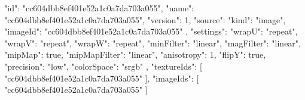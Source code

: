 {
  "id": "cc604dbb8ef401e52a1c0a7da703a055",
  "name": "cc604dbb8ef401e52a1c0a7da703a055",
  "version": 1,
  "source": {
    "kind": "image",
    "imageId": "cc604dbb8ef401e52a1c0a7da703a055"
  },
  "settings": {
    "wrapU": "repeat",
    "wrapV": "repeat",
    "wrapW": "repeat",
    "minFilter": "linear",
    "magFilter": "linear",
    "mipMap": true,
    "mipMapFilter": "linear",
    "anisotropy": 1,
    "flipY": true,
    "precision": "low",
    "colorSpace": "srgb"
  },
  "textureIds": [
    "cc604dbb8ef401e52a1c0a7da703a055"
  ],
  "imageIds": [
    "cc604dbb8ef401e52a1c0a7da703a055"
  ]
}
